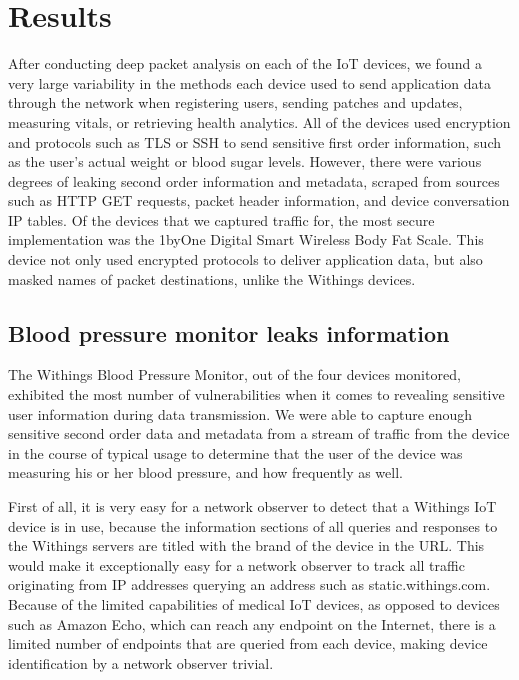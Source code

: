 \section{Results}

After conducting deep packet analysis on each of the IoT devices, we found a very large variability in the methods each device used to send application data through the network when registering users, sending patches and updates, measuring vitals, or retrieving health analytics. All of the devices used encryption and protocols such as TLS or SSH to send sensitive first order information, such as the user's actual weight or blood sugar levels. However, there were various degrees of leaking second order information and metadata, scraped from sources such as HTTP GET requests, packet header information, and device conversation IP tables. Of the devices that we captured traffic for, the most secure implementation was the 1byOne Digital Smart Wireless Body Fat Scale. This device not only used encrypted protocols to deliver application data, but also masked names of packet destinations, unlike the Withings devices. 

\subsection{Blood pressure monitor leaks information}
The Withings Blood Pressure Monitor, out of the four devices monitored, exhibited the most number of vulnerabilities when it comes to revealing sensitive user information during data transmission. We were able to capture enough sensitive second order data and metadata from a stream of traffic from the device in the course of typical usage to determine that the user of the device was measuring his or her blood pressure, and how frequently as well. 

First of all, it is very easy for a network observer to detect that a Withings IoT device is in use, because the information sections of all queries and responses to the Withings servers are titled with the brand of the device in the URL. This would make it exceptionally easy for a network observer to track all traffic originating from IP addresses querying an address such as static.withings.com. Because of the limited capabilities of medical IoT devices, as opposed to devices such as Amazon Echo, which can reach any endpoint on the Internet, there is a limited number of endpoints that are queried from each device, making device identification by a network observer trivial.

